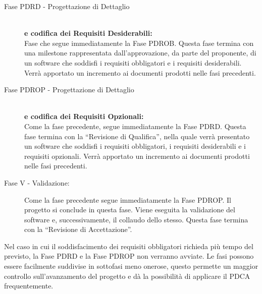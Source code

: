 \documentclass[../PianoProgetto.tex]{subfiles}
\begin{document}
\begin{description}
  
	\item[Fase PDRD - Progettazione di Dettaglio] \ \\
		\textbf{e codifica dei Requisiti Desiderabili:} \\
		Fase che segue immediatamente la Fase PDROB. Questa fase termina con una milestone rappresentata dall’approvazione, da parte del proponente, di un software che soddisfi i requisiti obbligatori e i requisiti desiderabili.
		Verrà apportato un incremento ai documenti prodotti nelle fasi precedenti.


	\item[Fase PDROP - Progettazione di Dettaglio] \ \\
		\textbf{e codifica dei Requisiti Opzionali:} \\
		Come la fase precedente, segue immediatamente la Fase PDRD. Questa fase termina con la “Revisione di Qualifica”, nella quale verrà presentato un software che soddisfi i requisiti obbligatori, i requisiti desiderabili e i requisiti opzionali.
		Verrà apportato un incremento ai documenti prodotti nelle fasi precedenti.


	\item[Fase V - Validazione:] Come la fase precedente segue immediatamente la Fase PDROP. Il progetto si conclude in questa fase. Viene eseguita la validazione del software e, successivamente, il collaudo dello stesso.
		Questa fase termina con la “Revisione di Accettazione”. 
		
	\end{description}
	
		Nel caso in cui il soddisfacimento dei requisiti obbligatori richieda più tempo del previsto, la Fase PDRD e la Fase PDROP non verranno avviate.
		Le fasi possono essere facilmente suddivise in sottofasi meno onerose, questo permette un maggior controllo sull’avanzamento del progetto e dà la possibilità di applicare il PDCA frequentemente.
\end{document}
